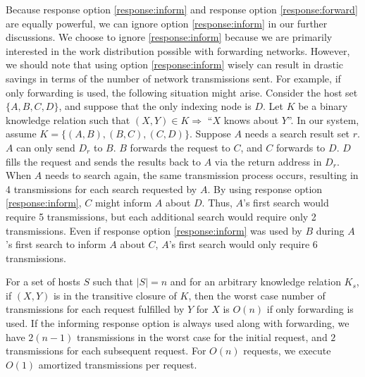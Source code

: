 \documentclass[12pt]{article}
\begin{document}
Because response option \ref{response:inform} and response option \ref{response:forward} are equally powerful, we can ignore option \ref{response:inform} in our further discussions.  We choose to ignore \ref{response:inform} because we are primarily interested in the work distribution possible with forwarding networks.  However, we should note that using option \ref{response:inform} wisely can result in drastic savings in terms of the number of network transmissions sent.  For example, if only forwarding is used, the following situation might arise.  Consider the host set $\{A, B, C, D\}$, and suppose that the only indexing node is $D$.  Let $K$ be a binary knowledge relation such that $(X,Y)\in K \Rightarrow$ ``$X$ knows about $Y$''.  In our system, assume $K=\{ (A,B), (B,C), (C,D) \}$.  Suppose $A$ needs a search result set $r$.  $A$ can only send $D_r$ to $B$.  $B$ forwards the request to $C$, and $C$ forwards to $D$.  $D$ fills the request and sends the results back to $A$ via the return address in $D_r$.  When $A$ needs to search again, the same transmission process occurs, resulting in 4 transmissions for each search requested by $A$.  By using response option \ref{response:inform}, $C$ might inform $A$ about $D$.  Thus, $A$'s first search would require 5 transmissions, but each additional search would require only 2 transmissions.  Even if response option \ref{response:inform} was used by $B$ during $A$'s first search to inform $A$ about $C$, $A$'s first search would only require 6 transmissions.  

For a set of hosts $S$ such that $|S|=n$ and for an arbitrary knowledge relation $K_s$, if $(X,Y)$ is in the transitive closure of $K$, then the worst case number of transmissions for each request fulfilled by $Y$ for $X$ is $O(n)$ if only forwarding is used.  If the informing response option is always used along with forwarding, we have $2(n-1)$ transmissions in the worst case for the initial request, and $2$ transmissions for each subsequent request.  For $O(n)$ requests, we execute $O(1)$ amortized transmissions per request.   

 
\end{document}
